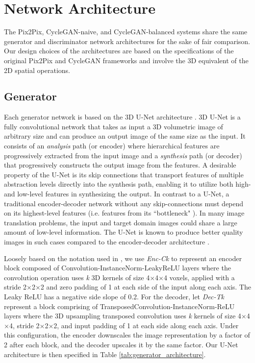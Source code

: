 \section{Network Architecture}
\label{network_architectures}
The Pix2Pix, CycleGAN-naive, and CycleGAN-balanced systems share the same generator and discriminator network architectures for the sake of fair comparison. Our design choices of the architectures are based on the specifications of the original Pix2Pix and CycleGAN frameworks \cite{isola2017image, zhu2017unpaired} and involve the 3D equivalent of the 2D spatial operations.

\subsection{Generator}
Each generator network is based on the 3D U-Net architecture \cite{cciccek20163d}. 3D U-Net is a fully convolutional network that takes as input a 3D volumetric image of arbitrary size and can produce an output image of the same size as the input. It consists of an \textit{analysis} path (or encoder) where hierarchical features are progressively extracted from the input image and a \textit{synthesis} path (or decoder) that progressively constructs the output image from the features. A desirable property of the U-Net is its skip connections that transport features of multiple abstraction levels directly into the synthesis path, enabling it to utilize both high- and low-level features in synthesizing the output. In contrast to a U-Net, a traditional encoder-decoder network without any skip-connections must depend on its highest-level features (i.e. features from its ``bottleneck" ). In many image translation problems, the input and target domain images could share a large amount of low-level information. The U-Net is known to produce better quality images in such cases compared to the encoder-decoder architecture \cite{isola2017image}.

Loosely based on the notation used in \cite{isola2017image}, we use \textit{Enc-Ck} to represent an encoder block composed of Convolution-InstanceNorm-LeakyReLU layers where the convolution operation uses \textit{k} 3D kernels of size 4$\times$4$\times$4 voxels, applied with a stride 2$\times$2$\times$2 and zero padding of 1 at each side of the input along each axis. The Leaky ReLU has a negative side slope of 0.2. For the decoder, let \textit{Dec-Tk} represent a block comprising of TransposedConvolution-InstanceNorm-ReLU layers where the 3D upsampling transposed convolution uses \textit{k} kernels of size 4$\times$4$\times$4, stride 2$\times$2$\times$2, and input padding of 1 at each side along each axis. Under this configuration, the encoder downscales the image representation by a factor of 2 after each block, and the decoder upscales it by the same factor. Our U-Net architecture is then specified in Table \ref{tab:generator_architecture}.

